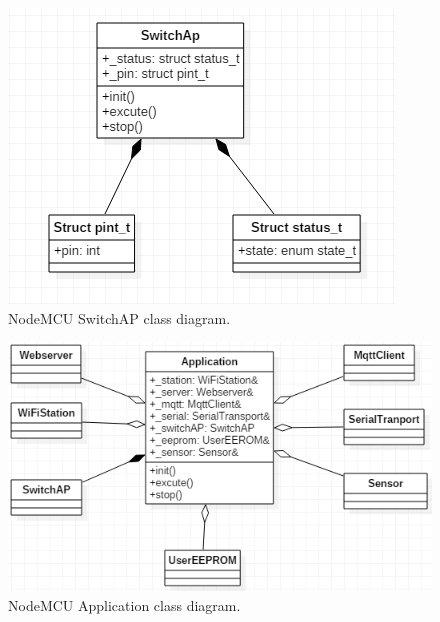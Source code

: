 \documentclass[a4paper,12pt,oneside]{article}
\begin{document}
\begin{figure}[H]
\centering
\begin{center}
\includegraphics[scale=.8]{hinh/class_switchap.PNG}
\end{center}
\caption{NodeMCU SwitchAP class diagram.}
\end{figure}

\begin{figure}[H]
\centering
\includegraphics[scale=.8]{hinh/class_nodeapplication.PNG}
\caption{NodeMCU Application class diagram.}
\end{figure}
\end{document}
